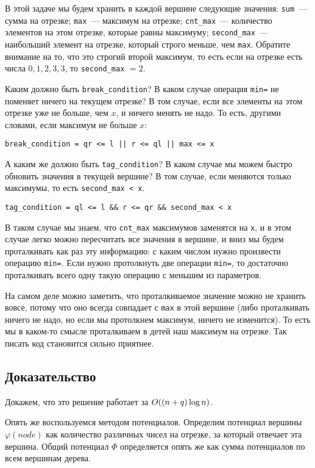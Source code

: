 В этой задаче мы будем хранить в каждой вершине следующие значения: \verb+sum+~--- сумма на отрезке; \verb+max+~--- максимум на отрезке; \verb+cnt_max+~--- количество элементов на этом отрезке, которые равны максимуму; \verb+second_max+~--- наибольший элемент на отрезке, который строго меньше, чем \verb+max+. Обратите внимание на то, что это строгий второй максимум, то есть если на отрезке есть числа $0, 1, 2, 3, 3$, то \verb+second_max+ $ = 2$.

Каким должно быть \verb+break_condition+? В каком случае операция \verb+min=+ не поменяет ничего на текущем отрезке? В том случае, если все элементы на этом отрезке уже не больше, чем $x$, и ничего менять не надо. То есть, другими словами, если максимум не больше $x$:

\verb+break_condition = qr <= l || r <= ql || max <= x+

А каким же должно быть \verb+tag_condition+? В каком случае мы можем быстро обновить значения в текущей вершине? В том случае, если меняются только максимумы, то есть \verb+second_max < x+.

\verb+tag_condition = ql <= l && r <= qr && second_max < x+

В таком случае мы знаем, что \verb+cnt_max+ максимумов заменятся на \verb+x+, и в этом случае легко можно пересчитать все значения в вершине, и вниз мы будем проталкивать как раз эту информацию: с каким числом нужно произвести операцию \verb+min=+. Если нужно протолкнуть две операции \verb+min=+, то достаточно проталкивать всего одну такую операцию с меньшим из параметров.

На самом деле можно заметить, что проталкиваемое значение можно не хранить вовсе, потому что оно всегда совпадает с \verb+max+ в этой вершине (либо проталкивать ничего не надо, но если мы протолкнем максимум, ничего не изменится). То есть мы в каком-то смысле проталкиваем в детей наш максимум на отрезке. Так писать код становится сильно приятнее.

\subsection{Доказательство}

Докажем, что это решение работает за $O((n + q) \log n)$.

Опять же воспользуемся методом потенциалов. Определим потенциал вершины $\varphi(node)$ как количество различных чисел на отрезке, за который отвечает эта вершина. Общий потенциал $\Phi$ определяется опять же как сумма потенциалов по всем вершинам дерева.

